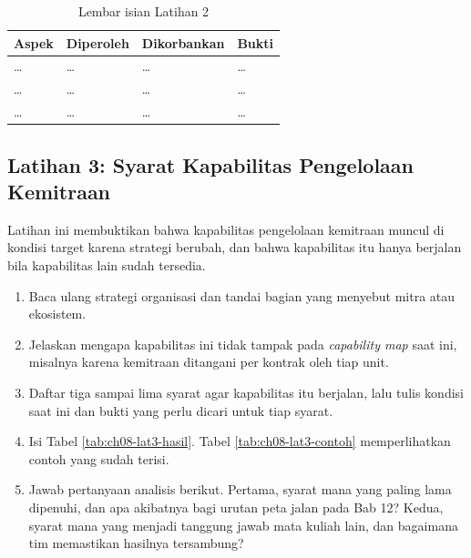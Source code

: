 \begin{table}[!htb]
  \centering
  \caption{Lembar isian Latihan 2}
  \label{tab:ch08-lat2-hasil}
  \begin{tabularx}{\textwidth}{>{\raggedright\arraybackslash}p{2.2cm}>{\raggedright\arraybackslash}X>{\raggedright\arraybackslash}X>{\raggedright\arraybackslash}p{2.5cm}}
    \hline
    \textbf{Aspek} & \textbf{Diperoleh} & \textbf{Dikorbankan} & \textbf{Bukti} \\
    \hline
    \dots & \dots & \dots & \dots \\
    \hline
    \dots & \dots & \dots & \dots \\
    \hline
    \dots & \dots & \dots & \dots \\
    \hline
  \end{tabularx}
\end{table}

\subsection*{Latihan 3: Syarat Kapabilitas Pengelolaan Kemitraan}

Latihan ini membuktikan bahwa kapabilitas pengelolaan kemitraan muncul di kondisi target
karena strategi berubah, dan bahwa kapabilitas itu hanya berjalan bila kapabilitas lain
sudah tersedia.

\begin{enumerate}
  \item Baca ulang strategi organisasi dan tandai bagian yang menyebut mitra atau
        ekosistem.
  \item Jelaskan mengapa kapabilitas ini tidak tampak pada \textit{capability map} saat ini,
        misalnya karena kemitraan ditangani per kontrak oleh tiap unit.
  \item Daftar tiga sampai lima syarat agar kapabilitas itu berjalan, lalu tulis kondisi
        saat ini dan bukti yang perlu dicari untuk tiap syarat.
  \item Isi Tabel \ref{tab:ch08-lat3-hasil}. Tabel \ref{tab:ch08-lat3-contoh} memperlihatkan
        contoh yang sudah terisi.
  \item Jawab pertanyaan analisis berikut. Pertama, syarat mana yang paling lama dipenuhi,
        dan apa akibatnya bagi urutan peta jalan pada Bab 12? Kedua, syarat mana yang
        menjadi tanggung jawab mata kuliah lain, dan bagaimana tim memastikan hasilnya
        tersambung?
\end{enumerate}

